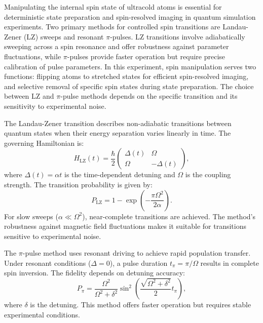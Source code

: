 
Manipulating the internal spin state of ultracold atoms is essential for deterministic state preparation and spin-resolved imaging in quantum simulation experiments. Two primary methods for controlled spin transitions are Landau-Zener (LZ) sweeps and resonant $\pi$-pulses. LZ transitions involve adiabatically sweeping across a spin resonance and offer robustness against parameter fluctuations, while $\pi$-pulses provide faster operation but require precise calibration of pulse parameters. In this experiment, spin manipulation serves two functions: flipping atoms to stretched states for efficient spin-resolved imaging, and selective removal of specific spin states during state preparation. The choice between LZ and $\pi$-pulse methods depends on the specific transition and its sensitivity to experimental noise.

The Landau-Zener transition describes non-adiabatic transitions between quantum states when their energy separation varies linearly in time. The governing Hamiltonian is:
\begin{equation*}
H_{\text{LZ}}(t) = \frac{\hbar}{2}
\begin{pmatrix}
\Delta(t) & \Omega \\
\Omega & -\Delta(t)
\end{pmatrix},
\label{eq:LZ_Hamiltonian}
\end{equation*}
where $\Delta(t) = \alpha t$ is the time-dependent detuning and $\Omega$ is the coupling strength. The transition probability is given by:
\begin{equation*}
P_{\text{LZ}} = 1 - \exp\left(-\frac{\pi \Omega^2}{2\alpha}\right).
\label{eq:LZ_probability}
\end{equation*}
For slow sweeps ($\alpha \ll \Omega^2$), near-complete transitions are achieved. The method's robustness against magnetic field fluctuations makes it suitable for transitions sensitive to experimental noise.

The $\pi$-pulse method uses resonant driving to achieve rapid population transfer. Under resonant conditions ($\Delta=0$), a pulse duration $t_\pi = \pi/\Omega$ results in complete spin inversion. The fidelity depends on detuning accuracy:
\begin{equation*}
P_{\pi} = \frac{\Omega^2}{\Omega^2+\delta^2}\sin^2\left(\frac{\sqrt{\Omega^2+\delta^2}}{2}t_{\pi}\right),
\label{eq:pi_fidelity}
\end{equation*}
where $\delta$ is the detuning. This method offers faster operation but requires stable experimental conditions.

